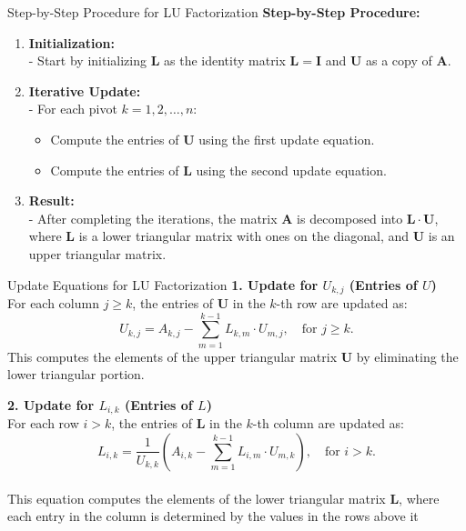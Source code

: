 \documentclass{beamer}
\begin{document}
	\begin{frame}{Step-by-Step Procedure for LU Factorization}
		\textbf{Step-by-Step Procedure:}
		\begin{enumerate}
			\item \textbf{Initialization:} \\
			- Start by initializing $ \mathbf{L} $ as the identity matrix $ \mathbf{L} = \mathbf{I} $ and $ \mathbf{U} $ as a copy of $ \mathbf{A} $.
			
			\item \textbf{Iterative Update:} \\
			- For each pivot $ k = 1, 2, \ldots, n $:
			\begin{itemize}
				\item Compute the entries of $ \mathbf{U} $ using the first update equation.
				\item Compute the entries of $ \mathbf{L} $ using the second update equation.
			\end{itemize}
			
			\item \textbf{Result:} \\
			- After completing the iterations, the matrix $ \mathbf{A} $ is decomposed into $ \mathbf{L} \cdot \mathbf{U} $, where $ \mathbf{L} $ is a lower triangular matrix with ones on the diagonal, and $ \mathbf{U} $ is an upper triangular matrix.
		\end{enumerate}
	\end{frame}
	\begin{frame}{Update Equations for LU Factorization}
		\textbf{1. Update for $ U_{k,j} $ (Entries of $ U $)} \\
		For each column $ j \geq k $, the entries of $ \mathbf{U} $ in the $ k $-th row are updated as:
		\[
		U_{k,j} = A_{k,j} - \sum_{m=1}^{k-1} L_{k,m} \cdot U_{m,j}, \quad \text{for } j \geq k.
		\]
		This computes the elements of the upper triangular matrix $ \mathbf{U} $ by eliminating the lower triangular portion.
		
		\textbf{2. Update for $ L_{i,k} $ (Entries of $ L $)} \\
		For each row $ i > k $, the entries of $ \mathbf{L} $ in the $ k $-th column are updated as:
		\[
		L_{i,k} = \frac{1}{U_{k,k}} \left( A_{i,k} - \sum_{m=1}^{k-1} L_{i,m} \cdot U_{m,k} \right), \quad \text{for } i > k.
		\]\\
		This equation computes the elements of the lower triangular matrix $ \mathbf{L} $, where each entry in the column is determined by the values in the rows above it
	\end{frame}
\end{document}
